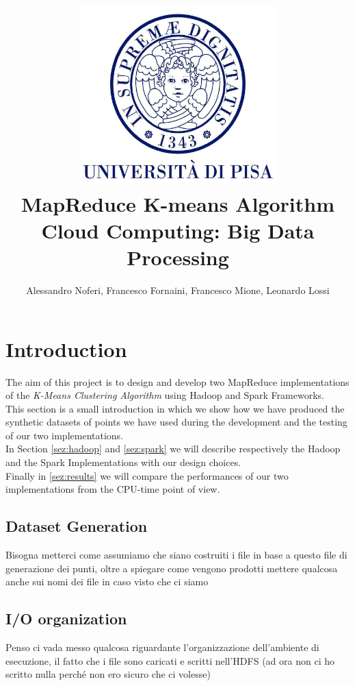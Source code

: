 \documentclass[11pt,a4paper]{article}
\author{Alessandro Noferi, Francesco Fornaini, Francesco Mione, Leonardo Lossi}
\title{\includegraphics[width=3in]{unipi}\\\textbf{MapReduce K-means Algorithm}\\{Cloud Computing: Big Data Processing}}
\begin{document}
\maketitle
{}%
\clearpage
\thispagestyle{empty}
\newpage
\tableofcontents
{}%
\clearpage
\thispagestyle{empty}
\newpage
{}

\section{Introduction}
The aim of this project is to design and develop two MapReduce implementations of the \textit{K-Means Clustering Algorithm} using Hadoop and Spark Frameworks.\\
This section is a small introduction in which we show how we have produced the synthetic datasets of points we have used during the development and the testing of our two implementations.\\
In Section \ref{sez:hadoop} and \ref{sez:spark} we will describe respectively the Hadoop and the Spark Implementations with our design choices.\\
Finally in \ref{sez:results} we will compare the performances of our two implementations from the CPU-time point of view.
\subsection{Dataset Generation}
Bisogna metterci come assumiamo che siano costruiti i file in base a questo file di generazione dei punti, oltre a spiegare come vengono prodotti
mettere qualcosa anche sui nomi dei file in caso visto che ci siamo
\subsection{I/O organization}
Penso ci vada messo qualcosa riguardante l'organizzazione dell'ambiente di esecuzione, il fatto che i file sono caricati e scritti nell'HDFS (ad ora non ci ho scritto nulla perché non ero sicuro che ci volesse)
\end{document}
